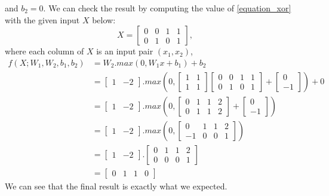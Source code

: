 and $\displaystyle b_2 = 0$. We can check the result by computing the value of \eqref{equation_xor} with the given input $\displaystyle X$ below:
\[ X = 
\begin{bmatrix}
    0 & 0 & 1 & 1 \\
    0 & 1 & 0 & 1
\end{bmatrix}, \]
where each column of $\displaystyle X$ is an input pair $\displaystyle (x_1, x_2)$,
\begin{align*}
    f(X; W_1, W_2, b_1, b_2) &= W_2.max(0, W_1x + b_1) + b_2 \\
    {} &= \begin{bmatrix}
            1 & -2
          \end{bmatrix}.max \left(0, 
            \begin{bmatrix}
                1 & 1 \\
                1 & 1
            \end{bmatrix} \begin{bmatrix}
                0 & 0 & 1 & 1 \\
                0 & 1 & 0 & 1
            \end{bmatrix} + \begin{bmatrix}
                0 \\
                -1
            \end{bmatrix}\right) + 0 \\
    {} &= \begin{bmatrix}
        1 & -2
      \end{bmatrix}.max \left(0, 
        \begin{bmatrix}
            0 & 1 & 1 & 2 \\
            0 & 1 & 1 & 2
        \end{bmatrix} + \begin{bmatrix}
            0 \\
            -1
        \end{bmatrix}\right) \\
    {} &= \begin{bmatrix}
        1 & -2
        \end{bmatrix}.max \left(0, 
        \begin{bmatrix}
            0 & 1 & 1 & 2 \\
            -1 & 0 & 0 & 1
        \end{bmatrix}\right) \\
    {} &= \begin{bmatrix}
        1 & -2
        \end{bmatrix}.\begin{bmatrix}
            0 & 1 & 1 & 2 \\
            0 & 0 & 0 & 1
        \end{bmatrix}\\
    {} &= \begin{bmatrix}
        0 & 1 & 1 & 0
        \end{bmatrix}
\end{align*}
We can see that the final result is exactly what we expected.


